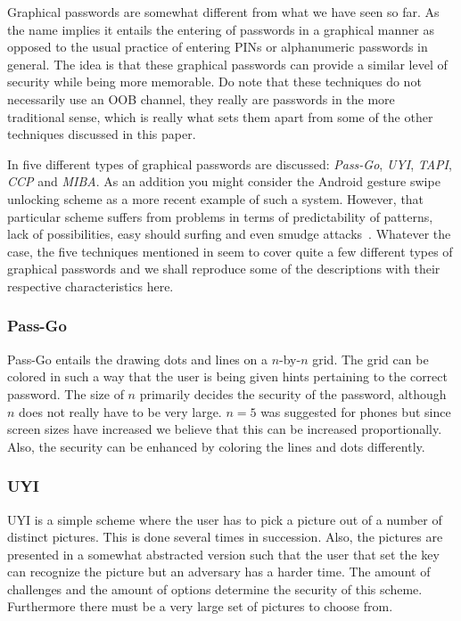 \documentclass[conference, 12pt]{sty/IEEEtran}
\begin{document}
Graphical passwords are somewhat different from what we have seen so far.
As the name implies it entails the entering of passwords in a graphical manner as opposed to the usual practice of entering PINs or alphanumeric passwords in general.
The idea is that these graphical passwords can provide a similar level of security while being more memorable.
Do note that these techniques do not necessarily use an OOB channel, they really are passwords in the more traditional sense, which is really what sets them apart from some of the other techniques discussed in this paper.

In \cite{gajos2006exploring} five different types of graphical passwords are discussed: \emph{Pass-Go}, \emph{UYI}, \emph{TAPI}, \emph{CCP} and \emph{MIBA}.
As an addition you might consider the Android gesture swipe unlocking scheme as a more recent example of such a system.
However, that particular scheme suffers from problems in terms of predictability of patterns, lack of possibilities, easy should surfing and even smudge attacks~\cite{aviv2010smudge}.
Whatever the case, the five techniques mentioned in \cite{gajos2006exploring} seem to cover quite a few different types of graphical passwords and we shall reproduce some of the descriptions with their respective characteristics here.

\subsubsection{Pass-Go}
\label{sssec:pass_go}

Pass-Go entails the drawing dots and lines on a $n$-by-$n$ grid.
The grid can be colored in such a way that the user is being given hints pertaining to the correct password.
The size of $n$ primarily decides the security of the password, although $n$ does not really have to be very large.
$n = 5$ was suggested for phones but since screen sizes have increased we believe that this can be increased proportionally.
Also, the security can be enhanced by coloring the lines and dots differently.

\subsubsection{UYI}
\label{sssec:uyi}

UYI is a simple scheme where the user has to pick a picture out of a number of distinct pictures.
This is done several times in succession.
Also, the pictures are presented in a somewhat abstracted version such that the user that set the key can recognize the picture but an adversary has a harder time.
The amount of challenges and the amount of options determine the security of this scheme.
Furthermore there must be a very large set of pictures to choose from.
\end{document}
